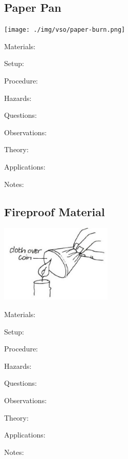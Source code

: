 \begin{multicols}{2}
\subsection{Paper Pan}

\begin{center}
\texttt{[image: ./img/vso/paper-burn.png]}
\end{center}

\begin{description*}
\item[Materials:]{}
\item[Setup:]{}
\item[Procedure:]{}
\item[Hazards:]{}
\item[Questions:]{}
\item[Observations:]{}
\item[Theory:]{}
\item[Applications:]{}
\item[Notes:]{}
\end{description*}

\subsection{Fireproof Material}

\begin{center}
\includegraphics[width=0.4\textwidth]{./img/vso/fireproof.png}
\end{center}

\begin{description*}
\item[Materials:]{}
\item[Setup:]{}
\item[Procedure:]{}
\item[Hazards:]{}
\item[Questions:]{}
\item[Observations:]{}
\item[Theory:]{}
\item[Applications:]{}
\item[Notes:]{}
\end{description*}


\end{multicols}
